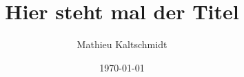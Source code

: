 \title{Hier steht mal der Titel}
\author{Mathieu Kaltschmidt}
\date{\today}

\usepackage[charter]{mathdesign}
\usepackage{amsmath}

\newcommand{\w}{\wedge}
\newcommand{\fu}{F^{\mu \nu}}
\newcommand{\fd}{F_{\mu \nu}}
\newcommand{\dct}{\partial_{ct}}
\newcommand{\hodge}{\text{*dF}}

\usepackage{fontspec} 
\usepackage{polyglossia}
\setmainlanguage{english}
\usepackage{microtype}

\usepackage{geometry}
\usepackage{xcolor}
\usepackage{graphicx}
\usepackage{float}

\geometry{
	width=150mm,
	bindingoffset=7mm,}



